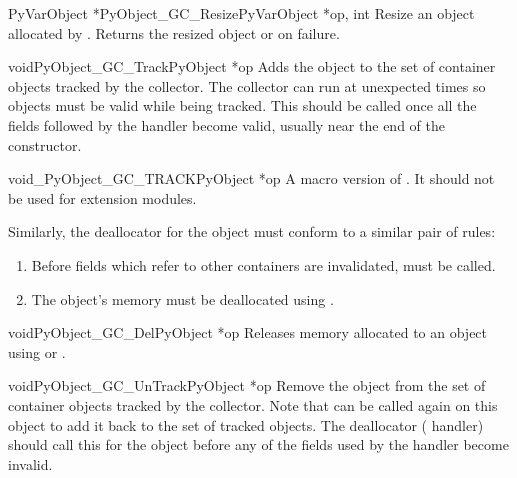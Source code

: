 \documentclass{manual}
\begin{document}
\begin{cfuncdesc}{PyVarObject *}{PyObject_GC_Resize}{PyVarObject *op, int}
  Resize an object allocated by .  Returns
  the resized object or \NULL{} on failure.
\end{cfuncdesc}

\begin{cfuncdesc}{void}{PyObject_GC_Track}{PyObject *op}
  Adds the object  to the set of container objects tracked by
  the collector.  The collector can run at unexpected times so objects
  must be valid while being tracked.  This should be called once all
  the fields followed by the  handler become valid,
  usually near the end of the constructor.
\end{cfuncdesc}

\begin{cfuncdesc}{void}{_PyObject_GC_TRACK}{PyObject *op}
  A macro version of .  It should not be
  used for extension modules.
\end{cfuncdesc}

Similarly, the deallocator for the object must conform to a similar
pair of rules:

\begin{enumerate}
\item  Before fields which refer to other containers are invalidated,
        must be called.

\item  The object's memory must be deallocated using
       .
\end{enumerate}

\begin{cfuncdesc}{void}{PyObject_GC_Del}{PyObject *op}
  Releases memory allocated to an object using
   or .
\end{cfuncdesc}

\begin{cfuncdesc}{void}{PyObject_GC_UnTrack}{PyObject *op}
  Remove the object  from the set of container objects tracked
  by the collector.  Note that  can be
  called again on this object to add it back to the set of tracked
  objects.  The deallocator ( handler) should call
  this for the object before any of the fields used by the
   handler become invalid.
\end{cfuncdesc}
\end{document}
